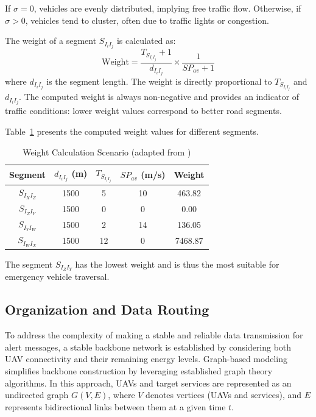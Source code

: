 If \( \sigma = 0 \), vehicles are evenly distributed, implying free traffic flow. Otherwise, if \( \sigma > 0 \), vehicles tend to cluster, often due to traffic lights or congestion.

The weight of a segment \( S_{I_i I_j} \) is calculated as:
\begin{equation}
    \text{Weight} = \frac{T_{S_{I_i I_j}} +1}{d_{I_i I_j}} \times \frac{1}{SP_{av} +1}
\end{equation}
where \( d_{I_i I_j} \) is the segment length. The weight is directly proportional to \( T_{S_{I_i I_j}} \) and \( d_{I_i I_j} \). The computed weight is always non-negative and provides an indicator of traffic conditions: lower weight values correspond to better road segments.

Table~\ref{tab:weight_calculation} presents the computed weight values for different segments.

\begin{table}[H]
    \centering
    \caption{Weight Calculation Scenario (adapted from \cite{oubbati2019leveraging})}
    \label{tab:weight_calculation}
    \begin{tabular}{|c|c|c|c|c|}
        \hline
        \textbf{Segment} & \( d_{I_i I_j} \) (m) & \( T_{S_{I_i I_j}} \) & \( SP_{av} \) (m/s) & \textbf{Weight} \\
        \hline
        \( S_{I_X I_Z} \) & 1500 & 5 & 10 & 463.82 \\
        \( S_{I_Z I_Y} \) & 1500 & 0 & 0 & 0.00 \\
        \( S_{I_Y I_W} \) & 1500 & 2 & 14 & 136.05 \\
        \( S_{I_W I_X} \) & 1500 & 12 & 0 & 7468.87 \\
        \hline
    \end{tabular}
\end{table}

The segment \( S_{I_Z I_Y} \) has the lowest weight and is thus the most suitable for emergency vehicle traversal.

\vspace{\baselineskip} %

\subsection{Organization and Data Routing}
To address the complexity of making a stable and reliable data transmission for alert messages, a stable backbone network is established by considering both UAV connectivity and their remaining energy levels. Graph-based modeling simplifies backbone construction by leveraging established graph theory algorithms. In this approach, UAVs and target services are represented as an undirected graph \( G(V,E) \), where \( V \) denotes vertices (UAVs and services), and \( E \) represents bidirectional links between them at a given time \( t \).


